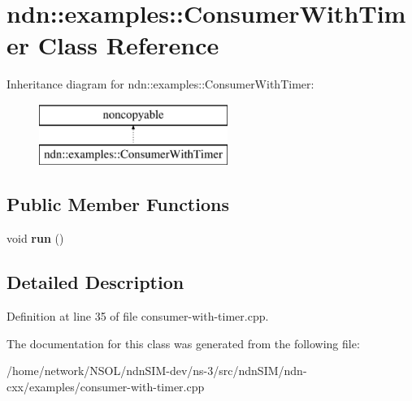 \hypertarget{classndn_1_1examples_1_1ConsumerWithTimer}{}\section{ndn\+:\+:examples\+:\+:Consumer\+With\+Timer Class Reference}
\label{classndn_1_1examples_1_1ConsumerWithTimer}
Inheritance diagram for ndn\+:\+:examples\+:\+:Consumer\+With\+Timer\+:\begin{figure}[H]
\begin{center}
\leavevmode
\includegraphics[height=2.000000cm]{classndn_1_1examples_1_1ConsumerWithTimer}
\end{center}
\end{figure}
\subsection*{Public Member Functions}
\begin{DoxyCompactItemize}
\item 
void {\bfseries run} ()\hypertarget{classndn_1_1examples_1_1ConsumerWithTimer_a6fb8dead90dbb43c9546a383cff91e3a}{}\label{classndn_1_1examples_1_1ConsumerWithTimer_a6fb8dead90dbb43c9546a383cff91e3a}

\end{DoxyCompactItemize}


\subsection{Detailed Description}


Definition at line 35 of file consumer-\/with-\/timer.\+cpp.



The documentation for this class was generated from the following file\+:\begin{DoxyCompactItemize}
\item 
/home/network/\+N\+S\+O\+L/ndn\+S\+I\+M-\/dev/ns-\/3/src/ndn\+S\+I\+M/ndn-\/cxx/examples/consumer-\/with-\/timer.\+cpp\end{DoxyCompactItemize}
